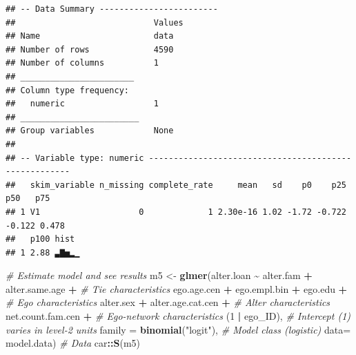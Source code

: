 \documentclass[
]{book}
\newenvironment{Shaded}{\begin{snugshade}}{\end{snugshade}}
\newcommand{\AttributeTok}[1]{\textcolor[rgb]{0.13,0.29,0.53}{#1}}
\newcommand{\CommentTok}[1]{\textcolor[rgb]{0.56,0.35,0.01}{\textit{#1}}}
\newcommand{\DecValTok}[1]{\textcolor[rgb]{0.00,0.00,0.81}{#1}}
\newcommand{\DocumentationTok}[1]{\textcolor[rgb]{0.56,0.35,0.01}{\textbf{\textit{#1}}}}
\newcommand{\FunctionTok}[1]{\textcolor[rgb]{0.13,0.29,0.53}{\textbf{#1}}}
\newcommand{\NormalTok}[1]{#1}
\newcommand{\OtherTok}[1]{\textcolor[rgb]{0.56,0.35,0.01}{#1}}
\newcommand{\SpecialCharTok}[1]{\textcolor[rgb]{0.81,0.36,0.00}{\textbf{#1}}}
\newcommand{\StringTok}[1]{\textcolor[rgb]{0.31,0.60,0.02}{#1}}
\begin{document}
\begin{Shaded}
\end{Shaded}

\begin{verbatim}
## -- Data Summary ------------------------
##                            Values
## Name                       data  
## Number of rows             4590  
## Number of columns          1     
## _______________________          
## Column type frequency:           
##   numeric                  1     
## ________________________         
## Group variables            None  
## 
## -- Variable type: numeric ------------------------------------------------------
##   skim_variable n_missing complete_rate     mean   sd    p0    p25    p50   p75
## 1 V1                    0             1 2.30e-16 1.02 -1.72 -0.722 -0.122 0.478
##   p100 hist 
## 1 2.88 ▃▇▅▂▁
\end{verbatim}

\begin{Shaded}
\begin{Highlighting}[]
\CommentTok{\# Estimate model and see results}
\NormalTok{m5 }\OtherTok{\textless{}{-}} \FunctionTok{glmer}\NormalTok{(alter.loan }\SpecialCharTok{\textasciitilde{}}\NormalTok{ alter.fam }\SpecialCharTok{+}\NormalTok{ alter.same.age }\SpecialCharTok{+} \CommentTok{\# Tie characteristics}
\NormalTok{              ego.age.cen }\SpecialCharTok{+}\NormalTok{ ego.empl.bin }\SpecialCharTok{+}\NormalTok{ ego.edu }\SpecialCharTok{+} \CommentTok{\# Ego characteristics}
\NormalTok{              alter.sex }\SpecialCharTok{+}\NormalTok{ alter.age.cat.cen }\SpecialCharTok{+}  \CommentTok{\# Alter characteristics}
\NormalTok{              net.count.fam.cen }\SpecialCharTok{+} \CommentTok{\# Ego{-}network characteristics}
\NormalTok{              (}\DecValTok{1} \SpecialCharTok{|}\NormalTok{ ego\_ID), }\CommentTok{\# Intercept (1) varies in level{-}2 units}
            \AttributeTok{family =} \FunctionTok{binomial}\NormalTok{(}\StringTok{"logit"}\NormalTok{), }\CommentTok{\# Model class (logistic)}
            \AttributeTok{data=}\NormalTok{ model.data) }\CommentTok{\# Data}
\NormalTok{car}\SpecialCharTok{::}\FunctionTok{S}\NormalTok{(m5)}
\end{Highlighting}
\end{Shaded}
\end{document}
